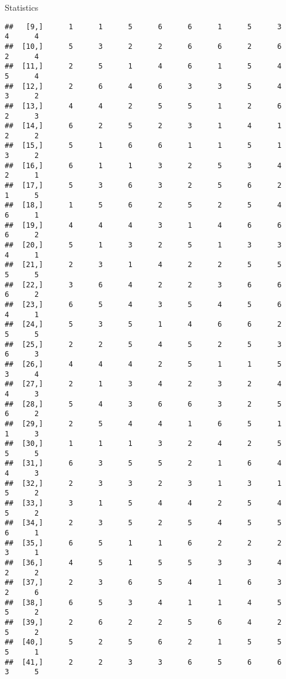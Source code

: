 \documentclass[
  ignorenonframetext,
]{beamer}
\begin{document}
\begin{frame}[fragile]{Statistics}
\begin{verbatim}
##   [9,]      1      1      5      6      6      1      5      3      4      4
##  [10,]      5      3      2      2      6      6      2      6      2      4
##  [11,]      2      5      1      4      6      1      5      4      5      4
##  [12,]      2      6      4      6      3      3      5      4      3      2
##  [13,]      4      4      2      5      5      1      2      6      2      3
##  [14,]      6      2      5      2      3      1      4      1      2      2
##  [15,]      5      1      6      6      1      1      5      1      3      2
##  [16,]      6      1      1      3      2      5      3      4      2      1
##  [17,]      5      3      6      3      2      5      6      2      1      5
##  [18,]      1      5      6      2      5      2      5      4      6      1
##  [19,]      4      4      4      3      1      4      6      6      6      2
##  [20,]      5      1      3      2      5      1      3      3      4      1
##  [21,]      2      3      1      4      2      2      5      5      5      5
##  [22,]      3      6      4      2      2      3      6      6      6      2
##  [23,]      6      5      4      3      5      4      5      6      4      1
##  [24,]      5      3      5      1      4      6      6      2      5      5
##  [25,]      2      2      5      4      5      2      5      3      6      3
##  [26,]      4      4      4      2      5      1      1      5      3      4
##  [27,]      2      1      3      4      2      3      2      4      4      3
##  [28,]      5      4      3      6      6      3      2      5      6      2
##  [29,]      2      5      4      4      1      6      5      1      1      3
##  [30,]      1      1      1      3      2      4      2      5      5      5
##  [31,]      6      3      5      5      2      1      6      4      4      3
##  [32,]      2      3      3      2      3      1      3      1      5      2
##  [33,]      3      1      5      4      4      2      5      4      5      2
##  [34,]      2      3      5      2      5      4      5      5      6      1
##  [35,]      6      5      1      1      6      2      2      2      3      1
##  [36,]      4      5      1      5      5      3      3      4      2      2
##  [37,]      2      3      6      5      4      1      6      3      2      6
##  [38,]      6      5      3      4      1      1      4      5      5      2
##  [39,]      2      6      2      2      5      6      4      2      5      2
##  [40,]      5      2      5      6      2      1      5      5      5      1
##  [41,]      2      2      3      3      6      5      6      6      3      5

\end{verbatim}
\end{frame}
\end{document}
